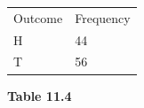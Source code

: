 {\begin{mdframed}[linewidth=4, leftmargin=40, rightmargin=40]
\begin{exercise}
\begin{enumerate}[noitemsep, label=\textbf{Step} \textbf{\arabic*}. ]
{{    %
    
        \begin{center}
      
      \label{m39373*id113415}
      
    \noindent
    \begin{tabular}[t]{|l|l|}\hline
    
    
        Outcome &
    
    
        Frequency%
     \tabularnewline\cline{1-1}\cline{2-2}
    
    
        H &
    
    
        44%
     \tabularnewline\cline{1-1}\cline{2-2}
    
    
        T &
    
    
        56%
     \tabularnewline\cline{1-1}\cline{2-2}
    \end{tabular}
      \end{center}
    \begin{center}{\small\bfseries Table 11.4}\end{center}
    
}}
\end{enumerate}
\end{exercise}
\end{mdframed}}
